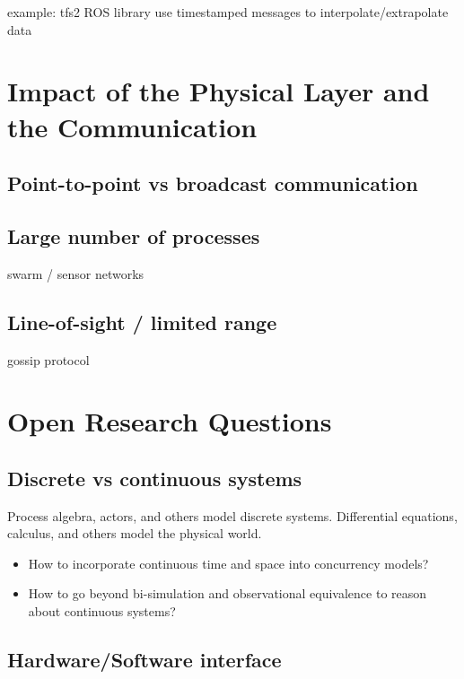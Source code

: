 \documentclass[
graybox,
envcountchap
]{svmult}
\begin{document}
\begin{bibunit}
    example: tfs2 ROS library use timestamped messages to interpolate/extrapolate data

\section{Impact of the Physical Layer and the Communication} %

    \subsection{Point-to-point vs broadcast communication}

    \subsection{Large number of processes}

    swarm / sensor networks

    \subsection{Line-of-sight / limited range}

    gossip protocol

\section{Open Research Questions} %

    \subsection{Discrete vs continuous systems}

    Process algebra, actors, and others model discrete systems.
    Differential equations, calculus, and others model the physical world.

    \begin{itemize}
    \item How to incorporate continuous time and space into concurrency models?
    \item How to go beyond bi-simulation and observational equivalence to reason about continuous systems?
    \end{itemize}
    
    \subsection{Hardware/Software interface}


\end{bibunit}
\end{document}
